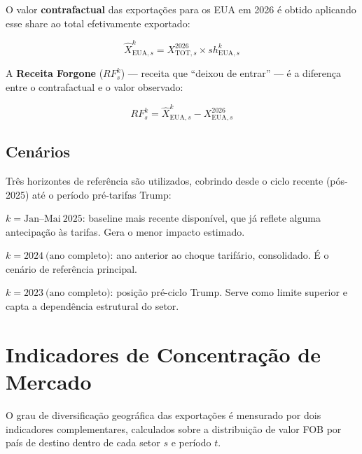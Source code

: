 \documentclass[12pt, a4paper]{article}
\begin{document}
O valor \textbf{contrafactual} das exportações para os EUA em 2026 é obtido
aplicando esse share ao total efetivamente exportado:

\begin{equation}
  \hat{X}_{\text{EUA},s}^{k} = X_{\text{TOT},s}^{2026} \times sh_{\text{EUA},s}^{k}
  \label{eq:ctf}
\end{equation}

A \textbf{Receita Forgone} (\(RF_s^k\)) — receita que ``deixou de entrar'' —
é a diferença entre o contrafactual e o valor observado:

\begin{equation}
  \boxed{
    RF_s^k = \hat{X}_{\text{EUA},s}^{k} - X_{\text{EUA},s}^{2026}
  }
  \label{eq:rf}
\end{equation}

\subsection{Cenários}

Três horizontes de referência são utilizados, cobrindo desde o ciclo
recente (pós-2025) até o período pré-tarifas Trump:

\vspace{0.5em}
\begin{description}[style=nextline, leftmargin=2cm]
  \item[Cenário A — Conservador]
    $k = \text{Jan--Mai}\ 2025$: baseline mais recente disponível,
    que já reflete alguma antecipação às tarifas. Gera o menor impacto estimado.

  \item[Cenário B — Base]
    $k = 2024\ \text{(ano completo)}$: ano anterior ao choque tarifário,
    consolidado. É o cenário de referência principal.

  \item[Cenário C — Estrutural]
    $k = 2023\ \text{(ano completo)}$: posição pré-ciclo Trump.
    Serve como limite superior e capta a dependência estrutural do setor.
\end{description}

\section{Indicadores de Concentração de Mercado}
\label{sec:conc}

O grau de diversificação geográfica das exportações é mensurado por dois
indicadores complementares, calculados sobre a distribuição de valor FOB
por país de destino dentro de cada setor \(s\) e período \(t\).
\end{document}
